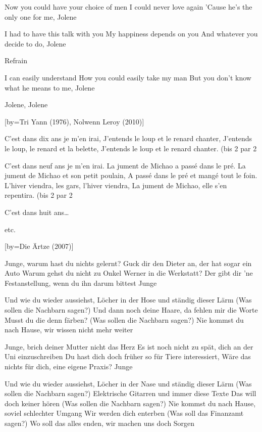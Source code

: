 \beginverse
Now you could have your choice of men
I could never love again
'Cause he's the only one for me, Jolene
\endverse

\beginverse
I had to have this talk with you
My happiness depends on you
And whatever you decide to do, Jolene
\endverse

\beginverse
Refrain
\endverse

\beginverse
I can easily understand
How you could easily take my man
But you don't know what he means to me, Jolene
\endverse

\beginverse
Jolene, Jolene\\[bis]
\endverse

[by={Tri Yann (1976), Nolwenn Leroy (2010)}]

\beginverse
C'est dans dix ans je m'en irai,
J'entends le loup et le renard chanter, 
J'entends le loup, le renard et la belette, 
J'entends le loup et le renard chanter.
(bis 2 par 2\)
\endverse

\beginverse
C'est dans neuf ans je m'en irai.
La jument de Michao a passé dans le pré.
La jument de Michao et son petit poulain,
A passé dans le pré et mangé tout le foin.
L'hiver viendra, les gars, l’hiver viendra,
La jument de Michao, elle s'en repentira.
(bis 2 par 2\)
\endverse

\beginverse
C'est dans huit ans…
\endverse

\beginverse
etc. 
\endverse

[by={Die Ärtze (2007)}]

\beginverse
Junge, warum hast du nichts gelernt?
Guck dir den Dieter an, der hat sogar ein Auto
Warum gehst du nicht zu Onkel Werner in die Werkstatt?
Der gibt dir 'ne Festanstellung, wenn du ihn darum bittest
Junge
\endverse

\beginverse
Und wie du wieder aussiehst, Löcher in der Hose und ständig dieser Lärm
(Was sollen die Nachbarn sagen?)
Und dann noch deine Haare, da fehlen mir die Worte
Musst du die denn färben?
(Was sollen die Nachbarn sagen?)
Nie kommst du nach Hause, wir wissen nicht mehr weiter
\endverse

\beginverse
Junge, brich deiner Mutter nicht das Herz
Es ist noch nicht zu spät, dich an der Uni einzuschreiben
Du hast dich doch früher so für Tiere interessiert,
Wäre das nichts für dich, eine eigene Praxis?
Junge
\endverse

\beginverse
Und wie du wieder aussiehst, Löcher in der Nase und ständig dieser Lärm
(Was sollen die Nachbarn sagen?)
Elektrische Gitarren und immer diese Texte
Das will doch keiner hören
(Was sollen die Nachbarn sagen?)
Nie kommst du nach Hause, soviel schlechter Umgang
Wir werden dich enterben
(Was soll das Finanzamt sagen?)
Wo soll das alles enden, wir machen uns doch Sorgen
\endverse

